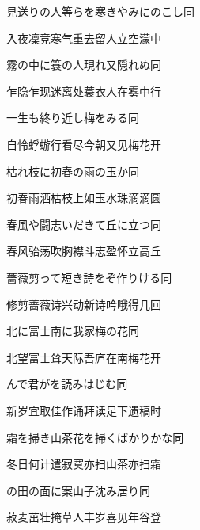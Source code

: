 \begin{haiku}
    {\FH 見送りの人等らを寒きやみにのこし}\hfill{\FH 同}

    {\FK 入夜凜竞寒气重去留人立空濛中}
\end{haiku}

\begin{haiku}
    {\FH 霧の中に簑の人現れ又隠れぬ}\hfill{\FH 同}

    {\FK 乍隐乍现迷离处蓑衣人在雾中行}
\end{haiku}

\begin{haiku}
    {\FH 一生も終り近し梅をみる}\hfill{\FH 同}

    {\FK 自怜蜉蝣行看尽今朝又见梅花开}
\end{haiku}

\begin{haiku}
    {\FH 枯れ枝に初春の雨の玉か}\hfill{\FH 同}

    {\FK 初春雨洒枯枝上如玉水珠滴滴圆}
\end{haiku}

\begin{haiku}
    {\FH 春風や闘志いだきて丘に立つ}\hfill{\FH 同}

    {\FK 春风骀荡吹胸襟斗志盈怀立高丘}
\end{haiku}

\begin{haiku}
    {\FH 薔薇剪って短き詩をぞ作りける}\hfill{\FH 同}

    {\FK 修剪蔷薇诗兴动新诗吟哦得几回}
\end{haiku}

\begin{haiku}
    {\FH 北に富士南に我家梅の花}\hfill{\FH 同}

    {\FK 北望富士耸天际吾庐在南梅花开}
\end{haiku}

\begin{haiku}
    {\FH {}んで君がを読みはじむ}\hfill{\FH 同}

    {\FK 新岁宜取佳作诵拜读足下遗稿时}
\end{haiku}

\begin{haiku}
    {\FH 霜を掃き山茶花を掃くばかりかな}\hfill{\FH 同}

    {\FK 冬日何计遣寂寞亦扫山茶亦扫霜}
\end{haiku}

\begin{haiku}
    {\FH {}の田の面に案山子沈み居り}\hfill{\FH 同}

    {\FK 菽麦茁壮掩草人丰岁喜见年谷登}
\end{haiku}

